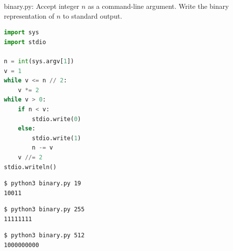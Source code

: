 \documentclass[8pt,a4paper,compress]{beamer}
\begin{document}
\begin{frame}[fragile]
\pause

\begin{framed}
\tiny binary.py: Accept integer $n$ as a command-line argument. Write the binary representation of $n$ to standard output.
\end{framed}

\begin{minipage}{150pt}
\begin{lstlisting}[language=Python,style=focusin]
import sys
import stdio

n = int(sys.argv[1])
v = 1
while v <= n // 2:
    v *= 2
while v > 0:
    if n < v:
        stdio.write(0)
    else:
        stdio.write(1)
        n -= v
    v //= 2
stdio.writeln()
\end{lstlisting}

\end{minipage}%
\begin{minipage}{150pt}
\hfill {}
\end{minipage}

\pause\bigskip

\begin{lstlisting}[language={},style=focusin]
$ python3 binary.py 19
10011
\end{lstlisting}

\pause\bigskip

\begin{lstlisting}[language={},style=focusin]
$ python3 binary.py 255
11111111
\end{lstlisting}

\pause\bigskip

\begin{lstlisting}[language={},style=focusin]
$ python3 binary.py 512
1000000000
\end{lstlisting}
\end{frame}
\end{document}
